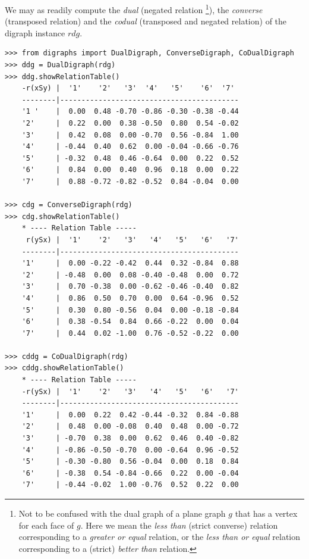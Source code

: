 We may as readily compute the \emph{dual} (negated relation \footnote{Not to be confused with the dual graph of a plane graph $g$ that has a vertex for each face of $g$. Here we mean the \emph{less than} (strict converse) relation corresponding to a \emph{greater or equal} relation, or the \emph{less than or equal} relation corresponding to a (strict) \emph{better than} relation.}), the \emph{converse} (transposed relation) and the \emph{codual} (transposed and negated relation) of the digraph instance $rdg$. 
\begin{lstlisting}[caption={Computing dual, converse and codual},label=list:2.7]
>>> from digraphs import DualDigraph, ConverseDigraph, CoDualDigraph
>>> ddg = DualDigraph(rdg)
>>> ddg.showRelationTable()
    -r(xSy) |  '1'    '2'   '3'  '4'   '5'    '6'  '7'	  
    --------|------------------------------------------
    '1 '    |  0.00  0.48 -0.70 -0.86 -0.30 -0.38 -0.44	 
    '2'     |  0.22  0.00  0.38 -0.50  0.80  0.54 -0.02	 
    '3'     |  0.42  0.08  0.00 -0.70  0.56 -0.84  1.00	 
    '4'     | -0.44  0.40  0.62  0.00 -0.04 -0.66 -0.76	 
    '5'     | -0.32  0.48  0.46 -0.64  0.00  0.22  0.52	 
    '6'     |  0.84  0.00  0.40  0.96  0.18  0.00  0.22	 
    '7'     |  0.88 -0.72 -0.82 -0.52  0.84 -0.04  0.00

>>> cdg = ConverseDigraph(rdg)
>>> cdg.showRelationTable()
    * ---- Relation Table -----
     r(ySx) |  '1'    '2'   '3'   '4'   '5'   '6'   '7'	  
    --------|------------------------------------------
    '1'     |  0.00 -0.22 -0.42  0.44  0.32 -0.84  0.88	 
    '2'     | -0.48  0.00  0.08 -0.40 -0.48  0.00  0.72	 
    '3'     |  0.70 -0.38  0.00 -0.62 -0.46 -0.40  0.82	 
    '4'     |  0.86  0.50  0.70  0.00  0.64 -0.96  0.52	 
    '5'     |  0.30  0.80 -0.56  0.04  0.00 -0.18 -0.84	 
    '6'     |  0.38 -0.54  0.84  0.66 -0.22  0.00  0.04	 
    '7'     |  0.44  0.02 -1.00  0.76 -0.52 -0.22  0.00	 

>>> cddg = CoDualDigraph(rdg)
>>> cddg.showRelationTable()
    * ---- Relation Table -----
    -r(ySx) |  '1'    '2'   '3'   '4'   '5'   '6'   '7'	    
    --------|------------------------------------------
    '1'     |  0.00  0.22  0.42 -0.44 -0.32  0.84 -0.88	 
    '2'     |  0.48  0.00 -0.08  0.40  0.48  0.00 -0.72	 
    '3'     | -0.70  0.38  0.00  0.62  0.46  0.40 -0.82	 
    '4'     | -0.86 -0.50 -0.70  0.00 -0.64  0.96 -0.52	 
    '5'     | -0.30 -0.80  0.56 -0.04  0.00  0.18  0.84	 
    '6'     | -0.38  0.54 -0.84 -0.66  0.22  0.00 -0.04	 
    '7'     | -0.44 -0.02  1.00 -0.76  0.52  0.22  0.00	 
\end{lstlisting}
  
